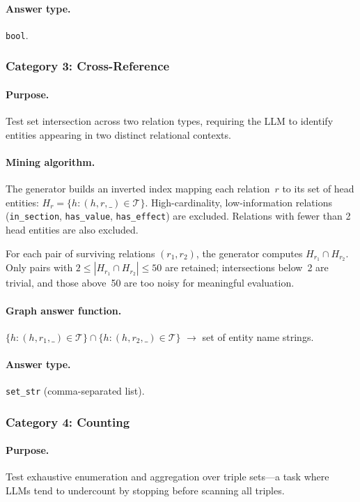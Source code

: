 \documentclass[11pt]{article}
\begin{document}
\paragraph{Answer type.} \texttt{bool}.

\subsubsection{Category 3: Cross-Reference}

\paragraph{Purpose.}  Test set intersection across two relation types,
requiring the LLM to identify entities appearing in two distinct
relational contexts.

\paragraph{Mining algorithm.}
The generator builds an inverted index mapping each relation~$r$ to its
set of head entities: $H_r = \{h : (h, r, \_) \in \mathcal{T}\}$.
High-cardinality, low-information relations (\texttt{in\_section},
\texttt{has\_value}, \texttt{has\_effect}) are excluded.  Relations with
fewer than 2 head entities are also excluded.

For each pair of surviving relations $(r_1, r_2)$, the generator computes
$H_{r_1} \cap H_{r_2}$.  Only pairs with $2 \leq |H_{r_1} \cap H_{r_2}|
\leq 50$ are retained; intersections below~2 are trivial, and those
above~50 are too noisy for meaningful evaluation.

\paragraph{Graph answer function.}
$\{h : (h, r_1, \_) \in \mathcal{T}\} \cap \{h : (h, r_2, \_) \in
\mathcal{T}\}$ $\to$ set of entity name strings.

\paragraph{Answer type.} \texttt{set\_str} (comma-separated list).

\subsubsection{Category 4: Counting}

\paragraph{Purpose.}  Test exhaustive enumeration and aggregation over
triple sets---a task where LLMs tend to undercount by stopping before
scanning all triples.
\end{document}
